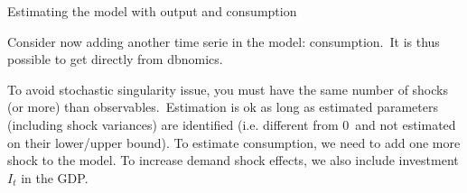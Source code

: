 \documentclass[a4paper,12pt]{article}%
\begin{document}
\newpage%

\begin{myexercise}{Estimating the model with output and consumption}
%


Consider now adding another time serie in the model: consumption.\ It is thus
possible to get directly from dbnomics.

To avoid stochastic singularity issue, you must have the same number of shocks
(or more) than observables.\ Estimation is ok as long as estimated parameters
(including shock variances) are identified (i.e. different from 0\ and not
estimated on their lower/upper bound). To estimate consumption, we need to add
one more shock to the model. To increase demand shock effects, we also include
investment $I_{t}$ in the GDP.


\end{myexercise}
\end{document}
